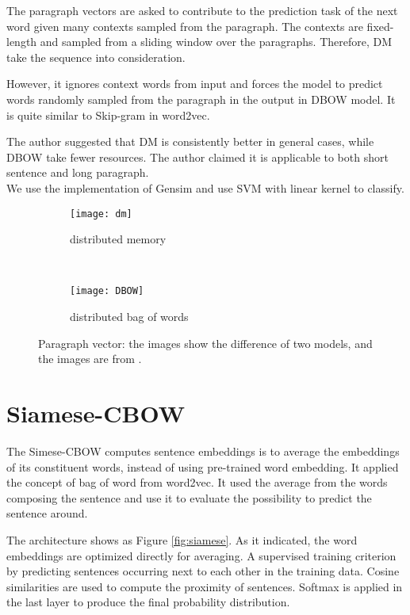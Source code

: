 The paragraph vectors are asked to contribute to the prediction task of the next word given many contexts sampled from the paragraph.
The contexts are fixed-length and sampled from a sliding window over the paragraphs. Therefore, DM take the sequence into consideration.

However, it ignores context words from input and forces the model to predict words randomly sampled from the paragraph in the output in DBOW model.
It is quite similar to Skip-gram in word2vec.

The author suggested that DM is consistently better in general cases, while DBOW take fewer resources. 
The author claimed it is applicable to both short sentence and long paragraph.\\

We use the implementation of Gensim and use SVM with linear kernel to classify.

\begin{figure}
\centering
\begin{subfigure}{.5\textwidth}
  \centering
  \texttt{[image: dm]}
  \caption{distributed memory}
  \label{fig:dm}
\end{subfigure}~
\begin{subfigure}{.5\textwidth}
  \centering
  \texttt{[image: DBOW]}
  \caption{distributed bag of words}
  \label{fig:dbow}
\end{subfigure}
\caption{Paragraph vector: the images show the difference of two models, and the images are from \cite{PVDM}.}
\label{fig:PVDM}
\end{figure}

\section{Siamese-CBOW}

The Simese-CBOW\cite{kenter2016siamesecbow} computes sentence embeddings is to average the embeddings of its constituent words, instead of using pre-trained word embedding. It applied the concept of bag of word from word2vec. It used the average from the words composing the sentence and use it to evaluate the possibility to predict the sentence around. 

The architecture shows as Figure \ref{fig:siamese}. As it indicated, the word embeddings are optimized directly for averaging.
A supervised training criterion by predicting sentences occurring next to each other in the training data.
Cosine similarities are used to compute the proximity of sentences.
Softmax is applied in the last layer to produce the final probability distribution.

